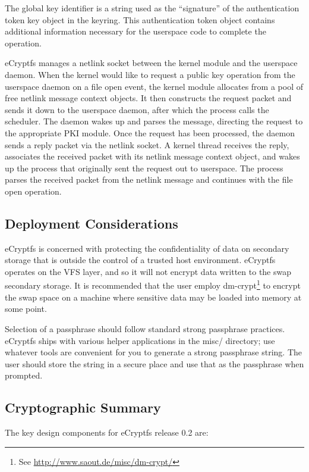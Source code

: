 \documentclass{article}
\begin{document}
The global key identifier is a string used as the ``signature'' of the
authentication token key object in the keyring. This authentication
token object contains additional information necessary for the
userspace code to complete the operation.

eCryptfs manages a netlink socket between the kernel module and the
userspace daemon. When the kernel would like to request a public key
operation from the userspace daemon on a file open event, the kernel
module allocates from a pool of free netlink message context
objects. It then constructs the request packet and sends it down to
the userspace daemon, after which the process calls the scheduler. The
daemon wakes up and parses the message, directing the request to the
appropriate PKI module. Once the request has been processed, the
daemon sends a reply packet via the netlink socket. A kernel thread
receives the reply, associates the received packet with its netlink
message context object, and wakes up the process that originally sent
the request out to userspace. The process parses the received packet
from the netlink message and continues with the file open operation.

\subsection{Deployment Considerations}

eCryptfs is concerned with protecting the confidentiality of data on
secondary storage that is outside the control of a trusted host
environment. eCryptfs operates on the VFS layer, and so it will not
encrypt data written to the swap secondary storage. It is recommended
that the user employ dm-crypt\footnote{See
\url{http://www.saout.de/misc/dm-crypt/}} to encrypt the swap space on
a machine where sensitive data may be loaded into memory at some
point.

Selection of a passphrase should follow standard strong passphrase
practices. eCryptfs ships with various helper applications in the
misc/ directory; use whatever tools are convenient for you to generate
a strong passphrase string. The user should store the string in a
secure place and use that as the passphrase when prompted.

\subsection{Cryptographic Summary}

The key design components for eCryptfs release 0.2 are:
\end{document}
